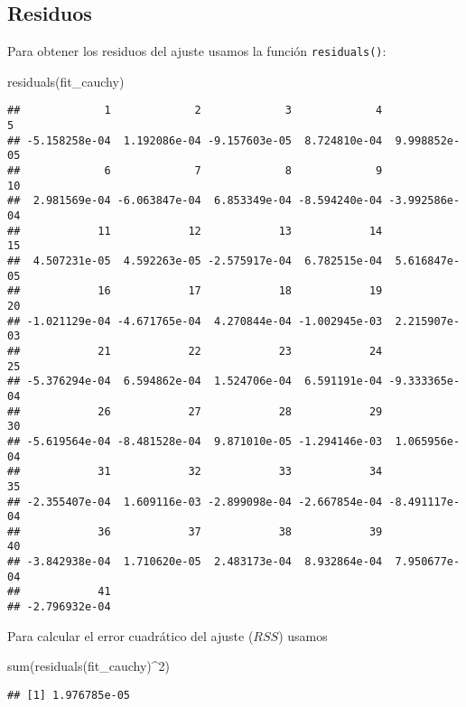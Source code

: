 \documentclass[
  degree=mecinf,
  title=normal,
  toc=normal,
  bib=normal]{mnye}
\newenvironment{Shaded}{\begin{snugshade}}{\end{snugshade}}
\newcommand{\DecValTok}[1]{\textcolor[rgb]{0.00,0.00,0.81}{#1}}
\newcommand{\FunctionTok}[1]{\textcolor[rgb]{0.00,0.00,0.00}{#1}}
\newcommand{\NormalTok}[1]{#1}
\newcommand{\SpecialCharTok}[1]{\textcolor[rgb]{0.00,0.00,0.00}{#1}}
\begin{document}
\hypertarget{residuos}{%
\subsection{Residuos}\label{residuos}}

Para obtener los residuos del ajuste usamos la función \texttt{residuals()}:

\begin{Shaded}
\begin{Highlighting}[]
\FunctionTok{residuals}\NormalTok{(fit\_cauchy)}
\end{Highlighting}
\end{Shaded}

\begin{verbatim}
##             1             2             3             4             5 
## -5.158258e-04  1.192086e-04 -9.157603e-05  8.724810e-04  9.998852e-05 
##             6             7             8             9            10 
##  2.981569e-04 -6.063847e-04  6.853349e-04 -8.594240e-04 -3.992586e-04 
##            11            12            13            14            15 
##  4.507231e-05  4.592263e-05 -2.575917e-04  6.782515e-04  5.616847e-05 
##            16            17            18            19            20 
## -1.021129e-04 -4.671765e-04  4.270844e-04 -1.002945e-03  2.215907e-03 
##            21            22            23            24            25 
## -5.376294e-04  6.594862e-04  1.524706e-04  6.591191e-04 -9.333365e-04 
##            26            27            28            29            30 
## -5.619564e-04 -8.481528e-04  9.871010e-05 -1.294146e-03  1.065956e-04 
##            31            32            33            34            35 
## -2.355407e-04  1.609116e-03 -2.899098e-04 -2.667854e-04 -8.491117e-04 
##            36            37            38            39            40 
## -3.842938e-04  1.710620e-05  2.483173e-04  8.932864e-04  7.950677e-04 
##            41 
## -2.796932e-04
\end{verbatim}

Para calcular el error cuadrático del ajuste (\(RSS\)) usamos

\begin{Shaded}
\begin{Highlighting}[]
\FunctionTok{sum}\NormalTok{(}\FunctionTok{residuals}\NormalTok{(fit\_cauchy)}\SpecialCharTok{\^{}}\DecValTok{2}\NormalTok{)}
\end{Highlighting}
\end{Shaded}

\begin{verbatim}
## [1] 1.976785e-05
\end{verbatim}
\end{document}
